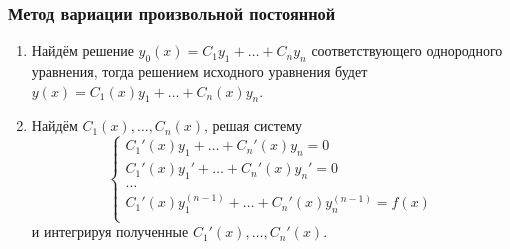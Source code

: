\subsubsection{Метод вариации произвольной постоянной}
\begin{enumerate}
	\item Найдём решение $y_0(x) = C_1 y_1 + \ldots + C_n y_n$ соответствующего однородного уравнения, тогда решением исходного уравнения будет $y(x) = C_1(x) y_1 + \ldots + C_n(x) y_n$.
	
	\item Найдём $C_1(x), \ldots, C_n(x)$, решая систему
	\begin{equation*}
	\begin{cases}
	C_1'(x) y_1 + \ldots + C_n'(x) y_n = 0 \\
	C_1'(x) y_1' + \ldots + C_n'(x) y_n' = 0 \\
	\ldots \\
	C_1'(x) y_1^{(n-1)} + \ldots + C_n'(x) y_n^{(n-1)} = f(x) \\
	\end{cases}
	\end{equation*}
	и интегрируя полученные $C_1'(x), \ldots, C_n'(x)$.
\end{enumerate}
